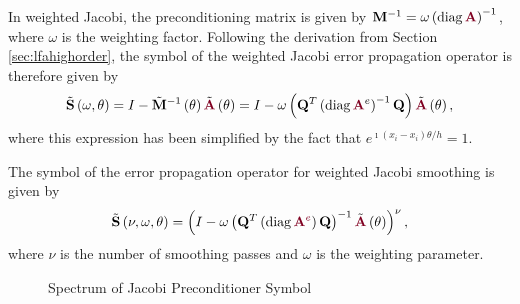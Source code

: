 In weighted Jacobi, the preconditioning matrix is given by $\mathbf{M}^{-1} = \omega \left( \diag {\color{burgundy}\mathbf{A}} \right)^{-1}$, where $\omega$ is the weighting factor.
Following the derivation from Section \ref{sec:lfahighorder}, the symbol of the weighted Jacobi error propagation operator is therefore given by
\begin{equation}
\tilde{\mathbf{S}} \left( \omega, \theta \right) = I - \tilde{\mathbf{M}}^{-1} \left( \theta \right) \tilde{{\color{burgundy}\mathbf{A}}} \left( \theta \right) = I - \omega \left( \mathbf{Q}^T \left( \diag {\color{burgundy}\mathbf{A}}^e \right)^{-1} \mathbf{Q} \right) \tilde{{\color{burgundy}\mathbf{A}}} \left( \theta \right),
\end{equation}
where this expression has been simplified by the fact that $e^{\imath \left( x_i - x_i \right) \theta / h} = 1$.

\begin{definition}
The symbol of the error propagation operator for weighted Jacobi smoothing is given by
\begin{equation}
\tilde{\mathbf{S}} \left( \nu, \omega, \theta \right) = \left( I - \omega \left( \mathbf{Q}^T \left( \diag {\color{burgundy}\mathbf{A}^e} \right) \mathbf{Q} \right)^{-1} \tilde{{\color{burgundy}\mathbf{A}}} \left( \theta \right) \right)^\nu,
\end{equation}
where $\nu$ is the number of smoothing passes and $\omega$ is the weighting parameter.
\label{def:jacobi_symbol}
\end{definition}

\begin{figure}[!ht]
  \centering
  \hfill
  \caption{Spectrum of Jacobi Preconditioner Symbol}
\end{figure}

